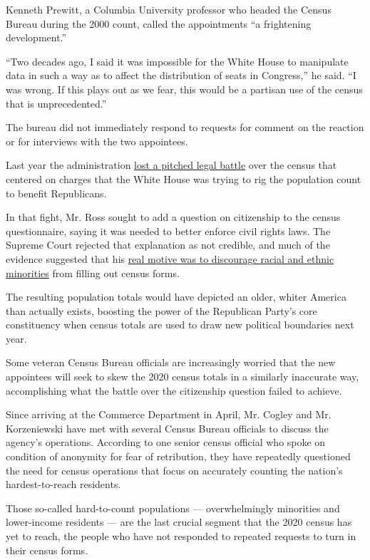Kenneth Prewitt, a Columbia University professor who headed the Census
Bureau during the 2000 count, called the appointments ``a frightening
development.''

``Two decades ago, I said it was impossible for the White House to
manipulate data in such a way as to affect the distribution of seats in
Congress,'' he said. ``I was wrong. If this plays out as we fear, this
would be a partisan use of the census that is unprecedented.''

The bureau did not immediately respond to requests for comment on the
reaction or for interviews with the two appointees.

Last year the administration
\href{https://www.nytimes.com/2019/07/02/us/trump-census-citizenship-question.html}{lost
a pitched legal battle} over the census that centered on charges that
the White House was trying to rig the population count to benefit
Republicans.

In that fight, Mr. Ross sought to add a question on citizenship to the
census questionnaire, saying it was needed to better enforce civil
rights laws. The Supreme Court rejected that explanation as not
credible, and much of the evidence suggested that his
\href{https://www.nytimes.com/2019/05/30/us/census-citizenship-question-hofeller.html}{real
motive was to discourage racial and ethnic minorities} from filling out
census forms.

The resulting population totals would have depicted an older, whiter
America than actually exists, boosting the power of the Republican
Party's core constituency when census totals are used to draw new
political boundaries next year.

Some veteran Census Bureau officials are increasingly worried that the
new appointees will seek to skew the 2020 census totals in a similarly
inaccurate way, accomplishing what the battle over the citizenship
question failed to achieve.

Since arriving at the Commerce Department in April, Mr. Cogley and Mr.
Korzeniewski have met with several Census Bureau officials to discuss
the agency's operations. According to one senior census official who
spoke on condition of anonymity for fear of retribution, they have
repeatedly questioned the need for census operations that focus on
accurately counting the nation's hardest-to-reach residents.

Those so-called hard-to-count populations --- overwhelmingly minorities
and lower-income residents --- are the last crucial segment that the
2020 census has yet to reach, the people who have not responded to
repeated requests to turn in their census forms.

